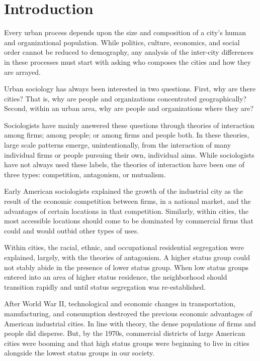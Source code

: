 \section{Introduction}
Every urban process depends upon the size and composition of a city's
human and organizational population. While politics, culture,
economics, and social order cannot be reduced to demography, any
analysis of the inter-city differences in these processes must start
with asking who composes the cities and how they are arrayed.

Urban sociology has always been interested in two
questions. First, why are there cities? That is, why are people and
organizations concentrated geographically? Second, within an urban
area, why are people and organizations where they are?

Sociologists have mainly answered these questions through theories of
interaction among firms; among people; or among firms and people
both. In these theories, large scale patterns emerge, unintentionally,
from the interaction of many individual firms or people pursuing their
own, individual aims.  While sociologists have not always used these
labels, the theories of interaction have been one of three types:
competition, antagonism, or mutualism.

Early American sociologists explained the growth of the
industrial city as the result of the economic competition between firms,
in a national market, and the advantages of certain locations in that
competition. Similarly, within cities, the most accessible locations
should come to be dominated by commercial firms that could and would
outbid other types of uses. 

Within cities, the racial, ethnic, and occupational residential
segregation were explained, largely, with the theories of
antagonism. A higher status group could not stably abide in the
presence of lower status group. When low status groups entered into an
area of higher status residence, the neighborhood should transition
rapidly and until status segregation was re-established.

After World War II, technological and economic changes in
transportation, manufacturing, and consumption destroyed the previous
economic advantages of American industrial cities. In line with
theory, the dense populations of firms and people did disperse. But,
by the 1970s, commercial districts of large American cities were
booming and that high status groups were beginning to live in cities
alongside the lowest status groups in our society.

